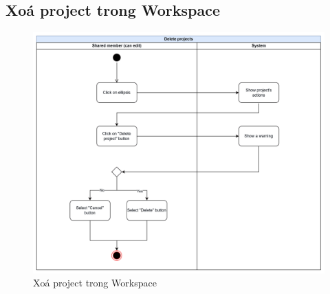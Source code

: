 \subsection{Xoá project trong Workspace}
    \begin{figure}[H]
        \centering
        \includegraphics[width=\linewidth]{Content/Phân tích và thiết kế hệ thống/documents/Sơ đồ hoạt động/images/deleteProjects.png}
        \vspace{0.5cm}
        \caption{Xoá project trong Workspace}
        \label{fig:Xoá project trong Workspace}
    \end{figure}